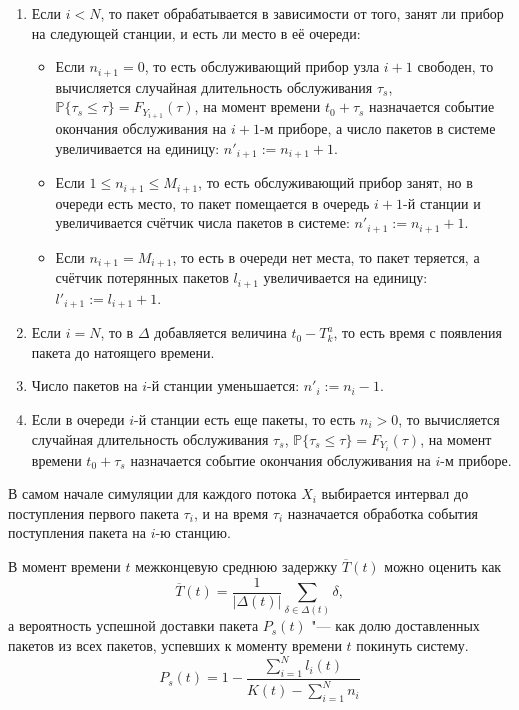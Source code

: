 \begin{enumerate}

\item{Если $i < N$, то пакет обрабатывается в зависимости от того, занят ли прибор на следующей станции, и есть ли место в её очереди:
\begin{itemize}
\item Если $n_{i+1} = 0$, то есть обслуживающий прибор узла $i+1$ свободен, то вычисляется случайная длительность обслуживания $\tau_s$, $\mathbb{P}\{\tau_s \leqslant \tau\} = F_{Y_{i+1}}(\tau)$, на момент времени $t_0 + \tau_s$ назначается событие окончания обслуживания на $i+1$-м приборе, а число пакетов в системе увеличивается на единицу: $n'_{i+1} := n_{i+1} + 1$.
\item Если $1 \leqslant n_{i+1} \leqslant M_{i+1}$, то есть обслуживающий прибор занят, но в очереди есть место, то пакет помещается в очередь $i+1$-й станции и увеличивается счётчик числа пакетов в системе: $n'_{i+1} := n_{i+1} + 1$.
\item Если $n_{i+1} = M_{i+1}$, то есть в очереди нет места, то пакет теряется, а счётчик потерянных пакетов $l_{i+1}$ увеличивается на единицу: $l'_{i+1} := l_{i+1} + 1$.
\end{itemize}
}

\item{Если $i = N$, то в $\Delta$ добавляется величина $t_0 - T_k^a$, то есть время с появления пакета до натоящего времени.}
\item{Число пакетов на $i$-й станции уменьшается: $n'_i := n_i - 1$.}
\item{Если в очереди $i$-й станции есть еще пакеты, то есть $n_i > 0$, то вычисляется случайная длительность обслуживания $\tau_s$, $\mathbb{P}\{\tau_s \leqslant \tau\} = F_{Y_i}(\tau)$, на момент времени $t_0 + \tau_s$ назначается событие окончания обслуживания на $i$-м приборе.}
\end{enumerate}

В самом начале симуляции для каждого потока $X_i$ выбирается интервал до поступления первого пакета $\tau_i$, и на время $\tau_i$ назначается обработка события поступления пакета на $i$-ю станцию.

В момент времени $t$ межконцевую среднюю задержку $\overline{T}(t)$ можно оценить как 
$$
\overline{T}(t) = \frac{1}{|\Delta(t)|}\sum\limits_{\delta \in \Delta(t)} \delta,
$$
а вероятность успешной доставки пакета $P_s(t)$ "--- как долю доставленных пакетов из всех пакетов, успевших к моменту времени $t$ покинуть систему.
$$
P_s(t) = 1 - \frac{\sum\limits_{i=1}^{N} l_i(t)}{K(t) - \sum\limits_{i=1}^{N} n_i}
$$

